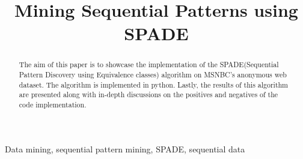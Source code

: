 \documentclass[conference]{IEEEtran}
\begin{document}
\title{Mining Sequential Patterns using SPADE}

\author{
}

\maketitle

\begin{abstract}
    The aim of this paper is to showcase the implementation of the SPADE(Sequential Pattern Discovery using Equivalence classes) algorithm on MSNBC's anonymous web dataset. The algorithm is implemented in python. Lastly, the results of this algorithm are presented along with in-depth discussions on the positives and negatives of the code implementation.
\end{abstract}

\begin{IEEEkeywords}
    Data mining, sequential pattern mining, SPADE, sequential data
\end{IEEEkeywords}














\end{document}
